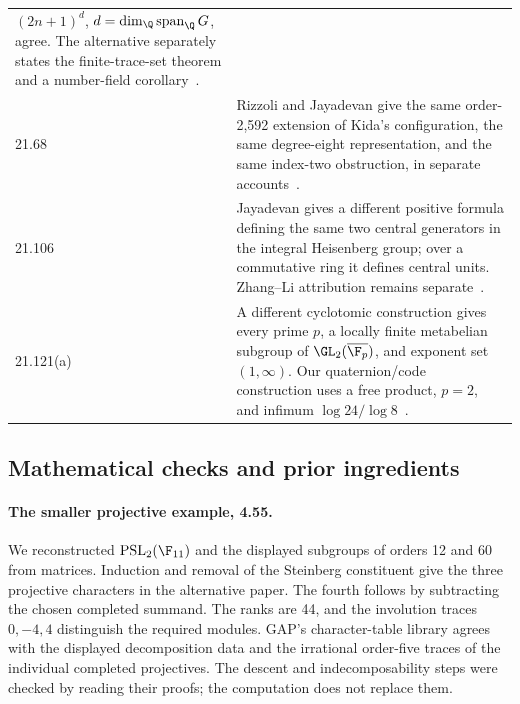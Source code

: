 \begin{longtable}{@{}p{}>{\raggedright\arraybackslash}p{}@{}}
\((2n+1)^d\), \(d=\dim_{\Q}\operatorname{span}_{\Q}G\), agree.
The alternative separately states the finite-trace-set theorem and a
number-field corollary~\cite{jayadevan-21-40}.\\[5pt]
21.68 & Rizzoli and Jayadevan give the same order-2,592 extension of
Kida's configuration, the same degree-eight representation, and the
same index-two obstruction, in separate accounts~\cite{rizzoli-21-68,jayadevan-21-68}.\\[5pt]
21.106 & Jayadevan gives a different positive formula defining the same
two central generators in the integral Heisenberg group; over a
commutative ring it defines central units. Zhang--Li attribution remains
separate~\cite{jayadevan-21-106,zhang-li-concise}.\\[5pt]
21.121(a) & A different cyclotomic construction gives every prime \(p\),
a locally finite metabelian subgroup of \(\GL_2(\overline{\F_p})\),
and exponent set \((1,\infty)\). Our quaternion/code construction
uses a free product, \(p=2\), and infimum
\(\log24/\log8\)~\cite{jayadevan-21-121a}.\\
\end{longtable}
\normalsize

\subsection{Mathematical checks and prior ingredients}

\paragraph{The smaller projective example, 4.55.}
We reconstructed \(\operatorname{PSL}_2(\F_{11})\) and the displayed
subgroups of orders 12 and 60 from matrices. Induction and removal of
the Steinberg constituent give the three projective characters in the
alternative paper. The fourth follows by subtracting the chosen
completed summand. The ranks are 44, and the involution traces
\(0,-4,4\) distinguish the required modules. GAP's character-table
library agrees with the displayed decomposition data and the irrational
order-five traces of the individual completed projectives. The descent
and indecomposability steps were checked by reading their proofs;
the computation does not replace them.

